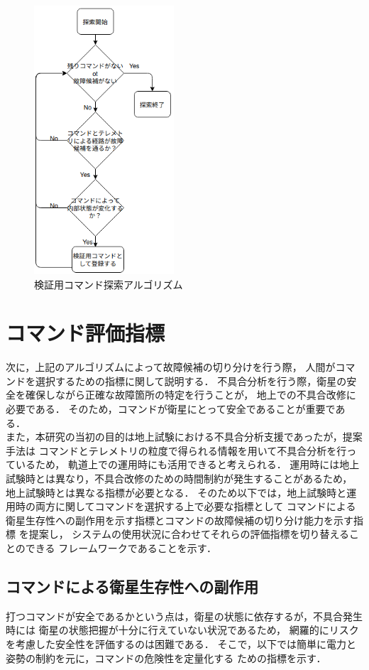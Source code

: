\documentclass[11pt]{jsreport}
\begin{document}
\begin{figure}[H]
   \centering
      \includegraphics[height=10.0cm]{figure/veri_COM_search.png}
      \caption{検証用コマンド探索アルゴリズム}
      \label{fig:veri_COM_algorithm}
\end{figure}

\newpage
\section{コマンド評価指標}
次に，上記のアルゴリズムによって故障候補の切り分けを行う際，
人間がコマンドを選択するための指標に関して説明する．
不具合分析を行う際，衛星の安全を確保しながら正確な故障箇所の特定を行うことが，
地上での不具合改修に必要である．
そのため，コマンドが衛星にとって安全であることが重要である．\\
また，本研究の当初の目的は地上試験における不具合分析支援であったが，提案手法は
コマンドとテレメトリの粒度で得られる情報を用いて不具合分析を行っているため，
軌道上での運用時にも活用できると考えられる．
運用時には地上試験時とは異なり，不具合改修のための時間制約が発生することがあるため，
地上試験時とは異なる指標が必要となる．
そのため以下では，地上試験時と運用時の両方に関してコマンドを選択する上で必要な指標として
コマンドによる衛星生存性への副作用を示す指標とコマンドの故障候補の切り分け能力を示す指標
を提案し，
システムの使用状況に合わせてそれらの評価指標を切り替えることのできる
フレームワークであることを示す．

\subsection{コマンドによる衛星生存性への副作用}
打つコマンドが安全であるかという点は，衛星の状態に依存するが，不具合発生時には
衛星の状態把握が十分に行えていない状況であるため，
網羅的にリスクを考慮した安全性を評価するのは困難である．
そこで，以下では簡単に電力と姿勢の制約を元に，コマンドの危険性を定量化する
ための指標を示す．
\end{document}
